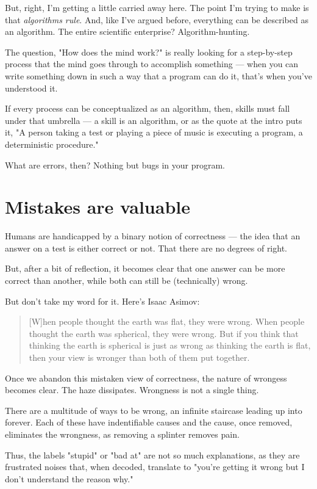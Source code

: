 But, right, I'm getting a little carried away here. The point I'm trying to make
is that \textit{algorithms rule}. And, like I've argued before, everything can be
described as an algorithm. The entire scientific enterprise? Algorithm-hunting.

The question, "How does the mind work?" is really looking for a step-by-step
process that the mind goes through to accomplish something --- when you can write
something down in such a way that a program can do it, that's when you've
understood it.

If every process can be conceptualized as an algorithm, then, skills must fall
under that umbrella --- a skill is an algorithm, or as the quote at the intro
puts it, "A person taking a test or playing a piece of music is executing a
program, a deterministic procedure."

What are errors, then? Nothing but bugs in your program.

\section{Mistakes are valuable}

Humans are handicapped by a binary notion of correctness --- the idea that an
answer on a test is either correct or not. That there are no degrees of right.

But, after a bit of reflection, it becomes clear that one answer can be more
correct than another, while both can still be (technically) wrong.

But don't take my word for it. Here's Isaac Asimov:

\begin{quote}
[W]hen people thought the earth was flat, they were wrong. When people thought
the earth was spherical, they were wrong. But if you think that thinking the
earth is spherical is just as wrong as thinking the earth is flat, then your
view is wronger than both of them put together.
\end{quote}
  
Once we abandon this mistaken view of correctness, the nature of
wrongess becomes clear. The haze dissipates. Wrongness is not a single thing.

There are a multitude of ways to be wrong, an infinite staircase leading up into
forever. Each of these have indentifiable causes and the cause, once removed, eliminates the
wrongness, as removing a splinter removes pain.

Thus, the labels "stupid" or "bad at" are not so much explanations, as
they are frustrated noises that, when decoded, translate to "you're getting it
wrong but I don't understand the reason why."

